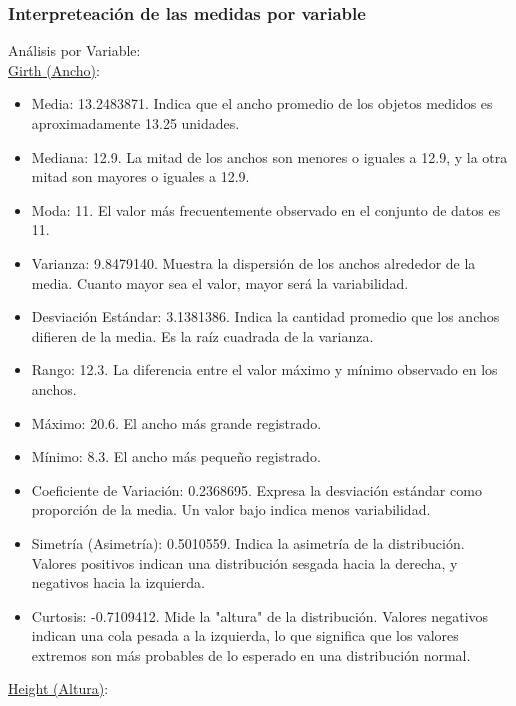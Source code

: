\documentclass{article}
\begin{document}
\subsubsection{Interpreteación de las medidas por variable}
Análisis por Variable:\\
\underline{Girth (Ancho)}:
\begin{itemize}
    \item Media: 13.2483871. Indica que el ancho promedio de los objetos medidos es aproximadamente 13.25 unidades.
    \item Mediana: 12.9. La mitad de los anchos son menores o iguales a 12.9, y la otra mitad son mayores o iguales a 12.9.
    \item Moda: 11. El valor más frecuentemente observado en el conjunto de datos es 11.
    \item Varianza: 9.8479140. Muestra la dispersión de los anchos alrededor de la media. Cuanto mayor sea el valor, mayor será la variabilidad.
    \item Desviación Estándar: 3.1381386. Indica la cantidad promedio que los anchos difieren de la media. Es la raíz cuadrada de la varianza.
    \item Rango: 12.3. La diferencia entre el valor máximo y mínimo observado en los anchos.
    \item Máximo: 20.6. El ancho más grande registrado.
    \item Mínimo: 8.3. El ancho más pequeño registrado.
    \item Coeficiente de Variación: 0.2368695. Expresa la desviación estándar como proporción de la media. Un valor bajo indica menos variabilidad.
    \item Simetría (Asimetría): 0.5010559. Indica la asimetría de la distribución. Valores positivos indican una distribución sesgada hacia la derecha, y negativos hacia la izquierda.
    \item Curtosis: -0.7109412. Mide la "altura" de la distribución. Valores negativos indican una cola pesada a la izquierda, lo que significa que los valores extremos son más probables de lo esperado en una distribución normal.
\end{itemize}
\underline{Height (Altura)}:
\end{document}
